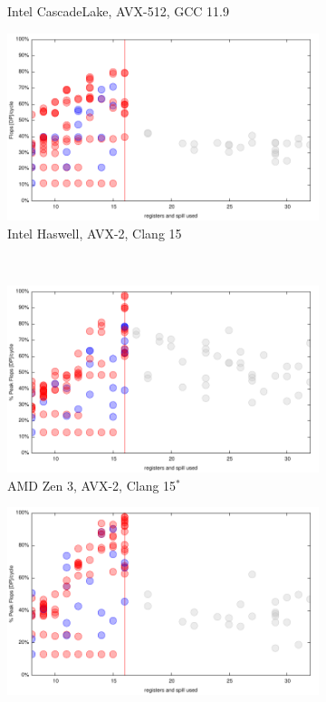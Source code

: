 \documentclass{article}
\begin{document}
\begin{figure}[h!]
\begin{subfigure}[h!]{0.45\textwidth}
  \caption{Intel CascadeLake, AVX-512, GCC 11.9}
  \end{subfigure}
    \begin{subfigure}[h!]{0.45\textwidth}
  \includegraphics[width=\textwidth]{../benches/gemm/haswell-64x256x64/greedy.pdf}
  \caption{Intel Haswell, AVX-2, Clang 15}
  \end{subfigure}\\
  \begin{subfigure}[h!]{0.45\textwidth}  
\includegraphics[width=\textwidth]{../benches/gemm/zen3-64x256x64/greedy.pdf}
  \caption{AMD Zen 3, AVX-2, Clang 15$^*$}
  \end{subfigure}
  \begin{subfigure}[h!]{0.45\textwidth}  
\includegraphics[width=\textwidth]{../benches/gemm/zen3-64x256x64/greedy-zen2.pdf}

\end{subfigure}
\end{figure}
\end{document}
